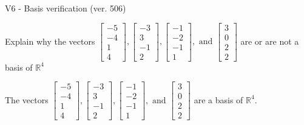 \begin{exercise}
  \begin{exerciseTitle}V6 - Basis verification (ver. 506)\end{exerciseTitle}
  \begin{exerciseStatement}
    Explain why the vectors \(\left[\begin{array}{r}
-5 \\
-4 \\
1 \\
4
\end{array}\right] , \left[\begin{array}{r}
-3 \\
3 \\
-1 \\
2
\end{array}\right] , \left[\begin{array}{r}
-1 \\
-2 \\
-1 \\
1
\end{array}\right] , \text{ and } \left[\begin{array}{r}
3 \\
0 \\
2 \\
2
\end{array}\right]\) are or are not a basis of \(\mathbb{R}^4\)	


  \end{exerciseStatement}
  \begin{exerciseAnswer}
   The vectors \(\left[\begin{array}{r}
-5 \\
-4 \\
1 \\
4
\end{array}\right] , \left[\begin{array}{r}
-3 \\
3 \\
-1 \\
2
\end{array}\right] , \left[\begin{array}{r}
-1 \\
-2 \\
-1 \\
1
\end{array}\right] , \text{ and } \left[\begin{array}{r}
3 \\
0 \\
2 \\
2
\end{array}\right]\) 
  	 are  a basis of \(\mathbb{R}^4\).
  


  \end{exerciseAnswer}
\end{exercise}